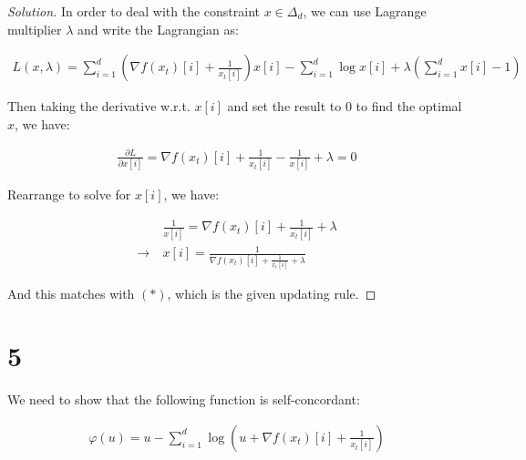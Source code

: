 \documentclass{article}
\newenvironment{solution}
  {\renewcommand\qedsymbol{$\blacksquare$}\begin{proof}[Solution]}
  {\end{proof}}
\begin{document}
\begin{solution}
    In order to deal with the constraint $x \in \Delta_d$, we can use Lagrange multiplier $\lambda$ and write the Lagrangian as:

    \begin{align*}
        L(x, \lambda) = \sum_{i=1}^d \left( \nabla f(x_t)[i] + \frac{1}{x_t[i]} \right) x[i] - \sum_{i=1}^d \log x[i] + \lambda \left( \sum_{i=1}^d x[i] - 1 \right)
    \end{align*}

    Then taking the derivative w.r.t. $x[i]$ and set the result to $0$ to find the optimal $x$, we have:

    \begin{align*}
        \frac{\partial L}{\partial x[i]} = \nabla f(x_t)[i] + \frac{1}{x_t[i]} - \frac{1}{x[i]} + \lambda = 0
    \end{align*}

    Rearrange to solve for $x[i]$, we have:

    \begin{align*}
        &\frac{1}{x[i]} = \nabla f(x_t)[i] + \frac{1}{x_t[i]} + \lambda \\
        \rightarrow \ &x[i] = \frac{1}{\nabla f(x_t)[i] + \frac{1}{x_t[i]} + \lambda}
    \end{align*}

    And this matches with $(*)$, which is the given updating rule.
\end{solution}

\section*{5}

We need to show that the following function is self-concordant:

\begin{align*}
    \varphi(u) = u - \sum_{i=1}^d \log (u + \nabla f(x_t)[i] + \frac{1}{x_t[i]})
\end{align*}
\end{document}
